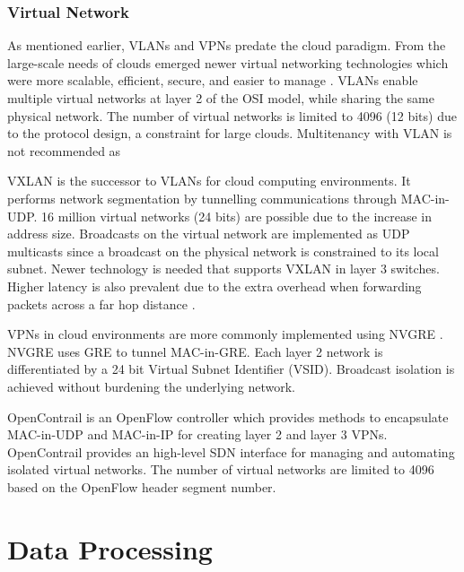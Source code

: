 \documentclass[12pt]{article}
\begin{document}
\subsubsection{Virtual Network}

As mentioned earlier, VLANs and VPNs predate the cloud paradigm. From the large-scale needs of clouds emerged newer virtual networking technologies which were more scalable, efficient, secure, and easier to manage \cite{wang2015survey}. VLANs enable multiple virtual networks at layer 2 of the OSI model, while sharing the same physical network. The number of virtual networks is limited to 4096 (12 bits) due to the protocol design, a constraint for large clouds. Multitenancy with VLAN is not recommended as

VXLAN \cite{vxlan} is the successor to VLANs for cloud computing environments. It performs network segmentation by tunnelling communications through MAC-in-UDP. 16 million virtual networks (24 bits) are possible due to the increase in address size. Broadcasts on the virtual network are implemented as UDP multicasts since a broadcast on the physical network is constrained to its local subnet. Newer technology is needed that supports VXLAN in layer 3 switches. Higher latency is also prevalent due to the extra overhead when forwarding packets across a far hop distance \cite{wang2015survey}.

VPNs in cloud environments are more commonly implemented using NVGRE \cite{nvgre}. NVGRE uses GRE to tunnel MAC-in-GRE. Each layer 2 network is differentiated by a 24 bit Virtual Subnet Identifier (VSID). Broadcast isolation is achieved without burdening the underlying network.

OpenContrail \cite{opencontrail} is an OpenFlow controller which provides methods to encapsulate MAC-in-UDP and MAC-in-IP for creating layer 2 and layer 3 VPNs. OpenContrail provides an high-level SDN interface for managing and automating isolated virtual networks. The number of virtual networks are limited to 4096 based on the OpenFlow header segment number.








\section{Data Processing} \label{sec:data-processing}
\end{document}
